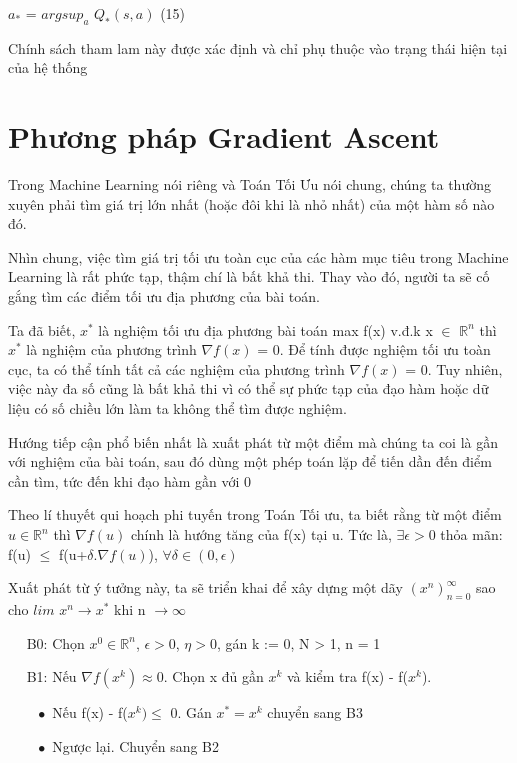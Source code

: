 \documentclass[14pt]{extreport}
\begin{document}
\begin{center}
$a_*$ = $argsup_{a}$  $Q_*(s,a)$ (15)
\end{center}

Chính sách tham lam này được xác định và chỉ phụ thuộc vào trạng thái hiện tại của hệ thống

\section{Phương pháp Gradient Ascent}
Trong Machine Learning nói riêng và Toán Tối Ưu nói chung, chúng ta thường xuyên phải tìm giá trị lớn nhất (hoặc đôi khi là nhỏ nhất) của một hàm số nào đó.

Nhìn chung, việc tìm giá trị tối ưu toàn cục của các hàm mục tiêu trong Machine Learning là rất phức tạp, thậm chí là bất khả thi. Thay vào đó, người ta sẽ cố gắng tìm các điểm tối ưu địa phương của bài toán.

Ta đã biết, $x^*$ là nghiệm tối ưu địa phương bài toán max f(x) v.đ.k x $\in$ $\mathbb{R}^n$ thì $x^*$ là nghiệm của phương trình $\nabla f(x)$ = 0. Để tính được nghiệm tối ưu toàn cục, ta có thể tính tất cả các nghiệm của phương trình $\nabla f(x)$ = 0. Tuy nhiên, việc này đa số cũng là bất khả thi vì có thể sự phức tạp của đạo hàm hoặc dữ liệu có số chiều lớn làm ta không thể tìm được nghiệm.

Hướng tiếp cận phổ biến nhất là xuất phát từ một điểm mà chúng ta coi là gần với nghiệm của bài toán, sau đó dùng một phép toán lặp để tiến dần đến điểm cần tìm, tức đến khi đạo hàm gần với 0

Theo lí thuyết qui hoạch phi tuyến trong Toán Tối ưu, ta biết rằng từ một điểm $u \in \mathbb{R}^n$ thì $\nabla f(u)$ chính là hướng tăng của f(x) tại u. Tức là, $\exists \epsilon >0$ thỏa mãn: f(u) $\leq$ f(u+$\delta.\nabla f(u)$), $\forall \delta \in (0, \epsilon)$

Xuất phát từ ý tưởng này, ta sẽ triển khai để xây dựng một dãy $(x^n)_{n=0}^{\infty}$ sao cho $lim$ $ x^n \rightarrow x^*$ khi n $\rightarrow \infty$

$\quad$ B0: Chọn $x^0 \in \mathbb{R}^n$, $\epsilon >0$, $\eta > 0$, gán k := 0, N > 1, n = 1

$\quad$ B1: Nếu $\nabla f(x^k) \approx 0$. Chọn x đủ gần $x^k$ và kiểm tra f(x) - f($x^k$).
 
$\quad \quad \bullet$ Nếu f(x) - f($x^k) \leq$   0. Gán $x^* = x^k$ chuyển sang B3

$\quad \quad \bullet$ Ngược lại. Chuyển sang B2
\end{document}
